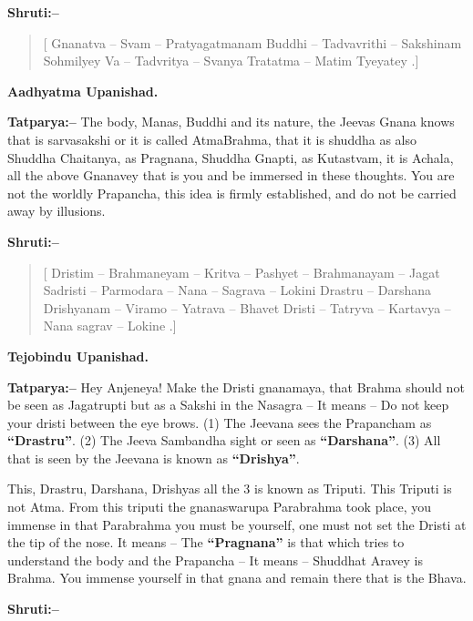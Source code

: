 \textbf{Shruti:–}

\begin{verse}
[ Gnanatva – Svam – Pratyagatmanam Buddhi – Tadvavrithi – Sakshinam  Sohmilyey Va – Tadvritya – Svanya Tratatma – Matim Tyeyatey .]
\end{verse}

\begin{flushright}
\textbf{Aadhyatma Upanishad.}
\end{flushright}

\textbf{Tatparya:–} The body, Manas, Buddhi and its nature, the Jeevas Gnana knows that is sarvasakshi or it is called AtmaBrahma, that it is shuddha as also Shuddha Chaitanya, as Pragnana, Shuddha Gnapti, as Kutastvam, it is Achala, all the above Gnanavey that is you and be immersed in these thoughts. You are not the worldly Prapancha, this idea is firmly established, and do not be carried away by illusions.

\textbf{Shruti:–}

\begin{verse}
[ Dristim – Brahmaneyam – Kritva – Pashyet – Brahmanayam – Jagat  Sadristi – Parmodara – Nana – Sagrava – Lokini  Drastru – Darshana Drishyanam – Viramo – Yatrava – Bhavet  Dristi – Tatryva – Kartavya – Nana sagrav – Lokine .]
\end{verse}

\begin{flushright}
\textbf{Tejobindu Upanishad.}
\end{flushright}

\textbf{Tatparya:–} Hey Anjeneya! Make the Dristi gnanamaya, that Brahma should not be seen as Jagatrupti but as a Sakshi in the Nasagra – It means – Do not keep your dristi between the eye brows. (1) The Jeevana sees the Prapancham as \textbf{“Drastru”}. (2) The Jeeva Sambandha sight or seen as \textbf{“Darshana”}. (3) All that is seen by the Jeevana is known as \textbf{“Drishya”}.

This, Drastru, Darshana, Drishyas all the 3 is known as Triputi. This Triputi is not Atma. From this triputi the gnanaswarupa Parabrahma took place, you immense in that Parabrahma you must be yourself, one must not set the Dristi at the tip of the nose. It means – The \textbf{“Pragnana”} is that which tries to understand the body and the Prapancha – It means – Shuddhat Aravey is Brahma. You immense yourself in that gnana and remain there that is the Bhava.

\textbf{Shruti:–}

